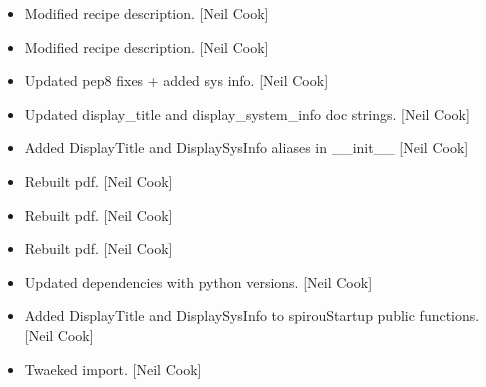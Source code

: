 \documentclass[a4paper,10pt,english]{report}
\begin{document}
\begin{itemize}
\item {} 
Modified recipe description. {[}Neil Cook{]}

\item {} 
Modified recipe description. {[}Neil Cook{]}

\item {} 
Updated pep8 fixes + added sys info. {[}Neil Cook{]}

\item {} 
Updated display\_title and display\_system\_info doc strings. {[}Neil Cook{]}

\item {} 
Added DisplayTitle and DisplaySysInfo aliases in \_\_init\_\_ {[}Neil Cook{]}

\item {} 
Rebuilt pdf. {[}Neil Cook{]}

\item {} 
Rebuilt pdf. {[}Neil Cook{]}

\item {} 
Rebuilt pdf. {[}Neil Cook{]}

\item {} 
Updated dependencies with python versions. {[}Neil Cook{]}

\item {} 
Added DisplayTitle and DisplaySysInfo to spirouStartup public
functions. {[}Neil Cook{]}

\item {} 
Twaeked import. {[}Neil Cook{]}

\end{itemize}
\end{document}
